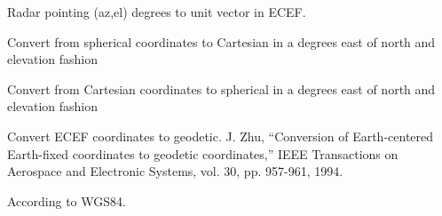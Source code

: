 \documentclass[letterpaper,10pt,english]{sphinxmanual}
\begin{document}

\begin{fulllineitems}
\label{\detokenize{modules/coord:coord.azel_ecef}}
Radar pointing (az,el) degrees to unit vector in ECEF.

\end{fulllineitems}


\begin{fulllineitems}
\label{\detokenize{modules/coord:coord.azel_to_cart}}
Convert from spherical coordinates to Cartesian in a degrees east of north and elevation fashion

\end{fulllineitems}


\begin{fulllineitems}
\label{\detokenize{modules/coord:coord.cart_to_azel}}
Convert from Cartesian coordinates to spherical in a degrees east of north and elevation fashion

\end{fulllineitems}


\begin{fulllineitems}
\label{\detokenize{modules/coord:coord.cbrt}}
\end{fulllineitems}


\begin{fulllineitems}
\label{\detokenize{modules/coord:coord.ecef2geodetic}}
Convert ECEF coordinates to geodetic.
J. Zhu, “Conversion of Earth-centered Earth-fixed coordinates
to geodetic coordinates,” IEEE Transactions on Aerospace and
Electronic Systems, vol. 30, pp. 957-961, 1994.

According to WGS84.

\end{fulllineitems}
\end{document}
